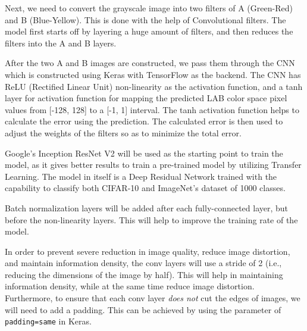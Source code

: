 \documentclass[10pt,twocolumn,letterpaper]{article}
\begin{document}
Next, we need to convert the grayscale image into two filters of A (Green-Red) and B (Blue-Yellow). This is done with the help of Convolutional filters. The model first starts off by layering a huge amount of filters, and then reduces the filters into the A and B layers.

After the two A and B images are constructed, we pass them through the CNN which is constructed using Keras with TensorFlow as the backend. The CNN has ReLU (Rectified Linear Unit) non-linearity as the activation function, and a tanh layer for activation function for mapping the predicted LAB color space pixel values from [-128, 128] to a [-1, 1] interval. The tanh activation function helps to calculate the error using the prediction. The calculated error is then used to adjust the weights of the filters so as to minimize the total error.

Google's Inception ResNet V2 will be used as the starting point to train the model, as it gives better results to train a pre-trained model by utilizing Transfer Learning. The model in itself is a Deep Residual Network trained with the capability to classify both CIFAR-10 and ImageNet's dataset of 1000 classes.

Batch normalization layers will be added after each fully-connected layer, but before the non-linearity layers. This will help to improve the training rate of the model.

In order to prevent severe reduction in image quality, reduce image distortion, and maintain information density, the conv layers will use a stride of 2 (i.e., reducing the dimensions of the image by half). This will help in maintaining information density, while at the same time reduce image distortion. Furthermore, to ensure that each conv layer \textit{does not} cut the edges of images, we will need to add a padding. This can be achieved by using the parameter of \verb|padding=same| in Keras.
\end{document}
